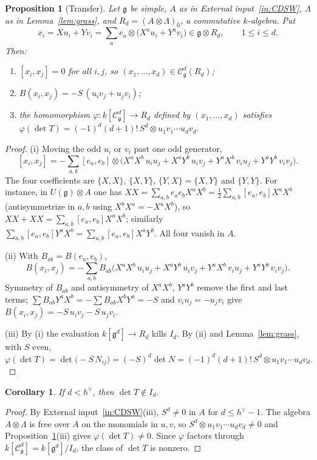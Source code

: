 \documentclass[11pt]{article}
\newtheorem{proposition}[theorem]{Proposition}
\newtheorem{corollary}[theorem]{Corollary}
\theoremstyle{definition}
\newcommand{\g}{\mathfrak g}
\newcommand{\Cs}{\mathcal C}
\newcommand{\hv}{h^\vee}
\begin{document}
\begin{proposition}[Transfer]\label{prop:transfer}
Let $\g$ be simple, $A$ as in External input~\ref{in:CDSW}, $\Lambda$ as in Lemma~\ref{lem:grass}, and $R_d=(A\otimes\Lambda)_{\bar0}$, a commutative $k$-algebra. Put
\[
x_i=Xu_i+Yv_i=\sum_ae_a\otimes\bigl(X^au_i+Y^av_i\bigr)\in\g\otimes R_d,\qquad 1\le i\le d.
\]
Then:
\begin{enumerate}[label=(\roman*)]
\item $[x_i,x_j]=0$ for all $i,j$, so $(x_1,\dots,x_d)\in\Cs^d_\g(R_d)$;
\item $B(x_i,x_j)=-S\,(u_iv_j+u_jv_i)$;
\item the homomorphism $\varphi:k[\Cs^d_\g]\to R_d$ defined by $(x_1,\dots,x_d)$ satisfies $\varphi(\det T)=(-1)^d(d+1)!\,S^d\otimes u_1v_1\cdots u_dv_d$.
\end{enumerate}
\end{proposition}
\begin{proof}
(i) Moving the odd $u_i$ or $v_i$ past one odd generator,
\[
[x_i,x_j]=-\sum_{a,b}[e_a,e_b]\otimes\bigl(X^aX^b\,u_iu_j+X^aY^b\,u_iv_j+Y^aX^b\,v_iu_j+Y^aY^b\,v_iv_j\bigr).
\]
The four coefficients are $\{X,X\}$, $\{X,Y\}$, $\{Y,X\}=\{X,Y\}$ and $\{Y,Y\}$. For instance, in $U(\g)\otimes A$ one has $XX=\sum_{a,b}e_ae_bX^aX^b=\tfrac12\sum_{a,b}[e_a,e_b]X^aX^b$ (antisymmetrize in $a,b$ using $X^bX^a=-X^aX^b$), so $XX+XX=\sum_{a,b}[e_a,e_b]X^aX^b$; similarly $\sum_{a,b}[e_a,e_b]Y^aX^b=\sum_{a,b}[e_a,e_b]X^aY^b$. All four vanish in $A$.

(ii) With $B_{ab}=B(e_a,e_b)$,
\[
B(x_i,x_j)=-\sum_{a,b}B_{ab}\bigl(X^aX^b\,u_iu_j+X^aY^b\,u_iv_j+Y^aX^b\,v_iu_j+Y^aY^b\,v_iv_j\bigr).
\]
Symmetry of $B_{ab}$ and antisymmetry of $X^aX^b$, $Y^aY^b$ remove the first and last terms; $\sum B_{ab}Y^aX^b=-\sum B_{ab}X^bY^a=-S$ and $v_iu_j=-u_jv_i$ give $B(x_i,x_j)=-S\,u_iv_j-S\,u_jv_i$.

(iii) By (i) the evaluation $k[\g^d]\to R_d$ kills $I_d$. By (ii) and Lemma~\ref{lem:grass}, with $S$ even,
\[
\varphi(\det T)=\det\bigl(-S\,N_{ij}\bigr)=(-S)^d\det N=(-1)^d(d+1)!\,S^d\otimes u_1v_1\cdots u_dv_d .
\]
\end{proof}

\begin{corollary}\label{cor:nonzero}
If $d<\hv$, then $\det T\notin I_d$.
\end{corollary}
\begin{proof}
By External input~\ref{in:CDSW}(iii), $S^d\neq0$ in $A$ for $d\le\hv-1$. The algebra $A\otimes\Lambda$ is free over $A$ on the monomials in $u,v$, so $S^d\otimes u_1v_1\cdots u_dv_d\neq0$ and Proposition~\ref{prop:transfer}(iii) gives $\varphi(\det T)\neq0$. Since $\varphi$ factors through $k[\Cs^d_\g]=k[\g^d]/I_d$, the class of $\det T$ is nonzero.
\end{proof}
\end{document}
